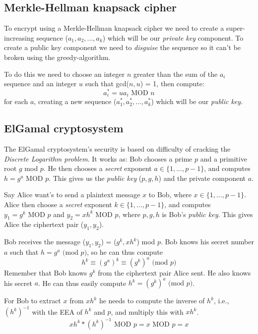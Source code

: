 \documentclass[12pt]{article}
\begin{document}
	
	
	\subsection*{Merkle-Hellman knapsack cipher \cite{knapsack-cipher}}
	To encrypt using a Merkle-Hellman knapsack cipher we need to create a super-increasing sequence ($a_1,a_2,...,a_k$) which will be our \textit{private key} component. To create a public key component we need to \textit{disguise} the sequence so it can't be broken using the greedy-algorithm. 
	
	To do this we need to choose an integer $n$ greater than the sum of the $a_i$ sequence and an integer $u$ such that gcd($n,u$) = 1, then compute:
	$$
	a_i^* = ua_i \text{ MOD } n
	$$
	for each $a$, creating a new sequence ($a_1^*,a_2^*,...,a_k^*$) which will be our \textit{public key}.
	
	
	
	\subsection*{ElGamal cryptosystem \cite{elgamal}}
	The ElGamal cryptosystem's security is based on difficulty of cracking the \textit{Discrete Logarithm problem}. It works as: Bob chooses a prime $p$ and a primitive root $g$ mod $p$. He then chooses a \textit{secret} exponent $a \in \{1,...,p-1\}$, and computes $h=g^a \text{ MOD $p$}$. This gives us the \textit{public key} ($p,g,h$) and the private component $a$. 
	
	Say Alice want's to send a plaintext message $x$ to Bob, where $x \in \{1,...,p-1\}$. Alice then choose a \textit{secret} exponent $k \in \{1,...,p-1\}$, and computes $y_1=g^k \text{ MOD $p$}$ and $y_2=xh^k \text{ MOD $p$}$, where $p,g,h$ is Bob's \textit{public key}. This gives Alice the ciphertext pair ($y_1,y_2$).   
	
	Bob receives the message ($y_1,y_2$) = ($g^k,xh^k$) mod $p$. Bob knows his secret number $a$ such that $h=g^a \text{ (mod $p$)}$, so he can thus compute 
	$$
	h^k \equiv (g^a)^k \equiv (g^k)^a \text{ (mod $p$)}
	$$
	Remember that Bob knows $g^k$ from the ciphertext pair Alice sent. He also knows his secret $a$. He can thus easily compute $h^k = (g^k)^a \text{ (mod $p$)}$.
	
	For Bob to extract $x$ from $xh^k$ he needs to compute the inverse of $h^k$, i.e., $(h^k)^{-1}$ with the EEA of $h^k$ and $p$, and multiply this with $xh^k$.
	$$
	xh^k*(h^k)^{-1} \text{ MOD $p$} = x \text{ MOD $p$} = x
	$$
	
\end{document}
